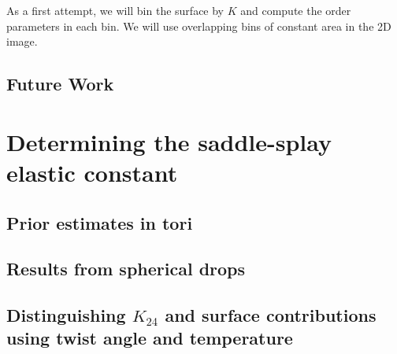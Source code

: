 As a first attempt, we will bin the surface by $K$ and compute the order parameters in each bin.
We will use overlapping bins of constant area in the 2D image.
\subsection{Future Work}

\section{Determining the saddle-splay elastic constant}
\subsection{Prior estimates in tori}
\subsection{Results from spherical drops}
\subsection{Distinguishing $K_{24}$ and surface contributions using twist angle and temperature}
